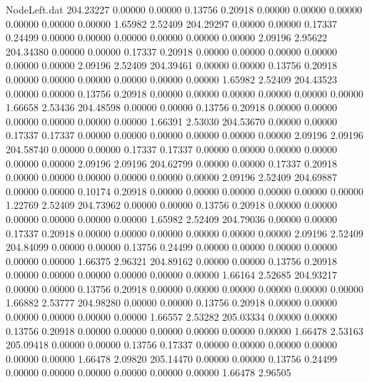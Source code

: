\begin{filecontents}{NodeLeft.dat}
 204.23227    0.00000    0.00000     0.13756    0.20918    0.00000    0.00000    0.00000    0.00000    0.00000    0.00000    1.65982    2.52409
 204.29297    0.00000    0.00000     0.17337    0.24499    0.00000    0.00000    0.00000    0.00000    0.00000    0.00000    2.09196    2.95622
 204.34380    0.00000    0.00000     0.17337    0.20918    0.00000    0.00000    0.00000    0.00000    0.00000    0.00000    2.09196    2.52409
 204.39461    0.00000    0.00000     0.13756    0.20918    0.00000    0.00000    0.00000    0.00000    0.00000    0.00000    1.65982    2.52409
 204.43523    0.00000    0.00000     0.13756    0.20918    0.00000    0.00000    0.00000    0.00000    0.00000    0.00000    1.66658    2.53436
 204.48598    0.00000    0.00000     0.13756    0.20918    0.00000    0.00000    0.00000    0.00000    0.00000    0.00000    1.66391    2.53030
 204.53670    0.00000    0.00000     0.17337    0.17337    0.00000    0.00000    0.00000    0.00000    0.00000    0.00000    2.09196    2.09196
 204.58740    0.00000    0.00000     0.17337    0.17337    0.00000    0.00000    0.00000    0.00000    0.00000    0.00000    2.09196    2.09196
 204.62799    0.00000    0.00000     0.17337    0.20918    0.00000    0.00000    0.00000    0.00000    0.00000    0.00000    2.09196    2.52409
 204.69887    0.00000    0.00000     0.10174    0.20918    0.00000    0.00000    0.00000    0.00000    0.00000    0.00000    1.22769    2.52409
 204.73962    0.00000    0.00000     0.13756    0.20918    0.00000    0.00000    0.00000    0.00000    0.00000    0.00000    1.65982    2.52409
 204.79036    0.00000    0.00000     0.17337    0.20918    0.00000    0.00000    0.00000    0.00000    0.00000    0.00000    2.09196    2.52409
 204.84099    0.00000    0.00000     0.13756    0.24499    0.00000    0.00000    0.00000    0.00000    0.00000    0.00000    1.66375    2.96321
 204.89162    0.00000    0.00000     0.13756    0.20918    0.00000    0.00000    0.00000    0.00000    0.00000    0.00000    1.66164    2.52685
 204.93217    0.00000    0.00000     0.13756    0.20918    0.00000    0.00000    0.00000    0.00000    0.00000    0.00000    1.66882    2.53777
 204.98280    0.00000    0.00000     0.13756    0.20918    0.00000    0.00000    0.00000    0.00000    0.00000    0.00000    1.66557    2.53282
 205.03334    0.00000    0.00000     0.13756    0.20918    0.00000    0.00000    0.00000    0.00000    0.00000    0.00000    1.66478    2.53163
 205.09418    0.00000    0.00000     0.13756    0.17337    0.00000    0.00000    0.00000    0.00000    0.00000    0.00000    1.66478    2.09820
 205.14470    0.00000    0.00000     0.13756    0.24499    0.00000    0.00000    0.00000    0.00000    0.00000    0.00000    1.66478    2.96505

\end{filecontents}
